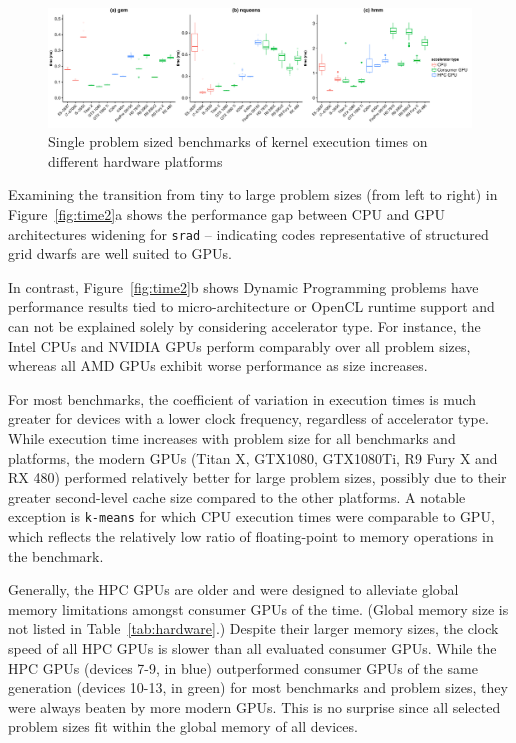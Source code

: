 \documentclass[../document.tex]{subfiles}
\begin{document}
\begin{figure}
    \centering
    \includegraphics[width=\textwidth,keepaspectratio]{figures/new-time-results/generate_main_2x3_bandwplot}
    \caption{Single problem sized benchmarks of kernel execution times on different hardware platforms}
    \label{fig:time3}
\end{figure}


Examining the transition from tiny to large problem sizes (from left to right) in Figure~\ref{fig:time2}a shows the performance gap between CPU and GPU architectures widening for {\tt srad} -- indicating codes representative of structured grid dwarfs are well suited to GPUs.

In contrast, Figure~\ref{fig:time2}b shows Dynamic Programming problems have performance results tied to micro-architecture or OpenCL runtime support and can not be explained solely by considering accelerator type.
For instance, the Intel CPUs and NVIDIA GPUs perform comparably over all problem sizes, whereas all AMD GPUs exhibit worse performance as size increases.

For most benchmarks, the coefficient of variation in execution times is much greater for devices with a lower clock frequency, regardless of accelerator type.
While execution time increases with problem size for all benchmarks and platforms, the modern GPUs (Titan X, GTX1080, GTX1080Ti, R9 Fury X and RX 480) performed relatively better for large problem sizes, possibly due to their greater second-level cache size compared to the other platforms.
A notable exception is {\tt k-means} for which CPU execution times were comparable to GPU, which reflects the relatively low ratio of floating-point to memory operations in the benchmark.

Generally, the HPC GPUs are older and were designed to alleviate global memory limitations amongst consumer GPUs of the time.
(Global memory size is not listed in Table~\ref{tab:hardware}.)
Despite their larger memory sizes, the clock speed of all HPC GPUs is slower than all evaluated consumer GPUs.
While the HPC GPUs (devices 7-9, in blue) outperformed consumer GPUs of the same generation (devices 10-13, in green) for most benchmarks and problem sizes, they were always beaten by more modern GPUs.
This is no surprise since all selected problem sizes fit within the global memory of all devices.
\end{document}
